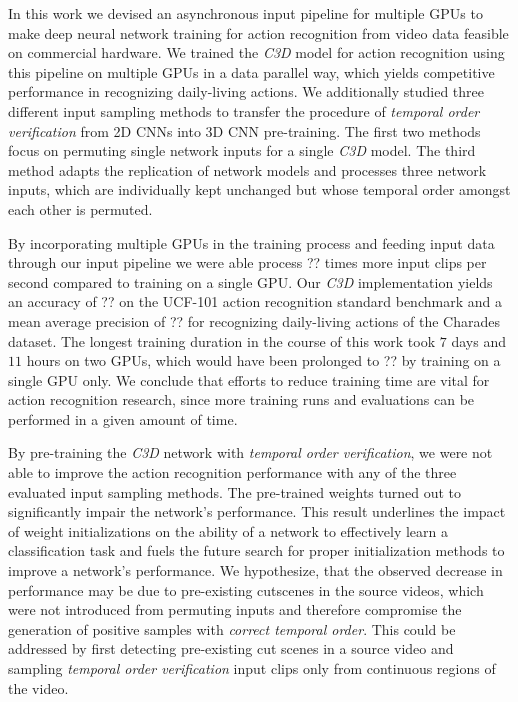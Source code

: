 In this work we devised an asynchronous input pipeline for multiple GPUs to make deep neural network training for action recognition from video data feasible on commercial hardware.
We trained the \textit{C3D} model for action recognition using this pipeline on multiple GPUs in a data parallel way, which yields competitive performance in recognizing daily-living actions.
We additionally studied three different input sampling methods to transfer the procedure of \textit{temporal order verification} from 2D CNNs into 3D CNN pre-training.
The first two methods focus on permuting single network inputs for a single \textit{C3D} model.
The third method adapts the replication of network models and processes three network inputs, which are individually kept unchanged but whose temporal order amongst each other is permuted.

By incorporating multiple GPUs in the training process and feeding input data through our input pipeline we were able process ?? times more input clips per second compared to training on a single GPU.
Our \textit{C3D} implementation yields an accuracy of ?? on the UCF-101 action recognition standard benchmark and a mean average precision of ?? for recognizing daily-living actions of the Charades dataset.
The longest training duration in the course of this work took $7$ days and $11$ hours on two GPUs, which would have been prolonged to ?? by training on a single GPU only.
We conclude that efforts to reduce training time are vital for action recognition research, since more training runs and evaluations can be performed in a given amount of time.

By pre-training the \textit{C3D} network with \textit{temporal order verification}, we were not able to improve the action recognition performance with any of the three evaluated input sampling methods.
The pre-trained weights turned out to significantly impair the network's performance.
This result underlines the impact of weight initializations on the ability of a network to effectively learn a classification task and fuels the future search for proper initialization methods to improve a network's performance.
We hypothesize, that the observed decrease in performance may be due to pre-existing cutscenes in the source videos, which were not introduced from permuting inputs and therefore compromise the generation of positive samples with \textit{correct temporal order}.
This could be addressed by first detecting pre-existing cut scenes in a source video and sampling \textit{temporal order verification} input clips only from continuous regions of the video.

